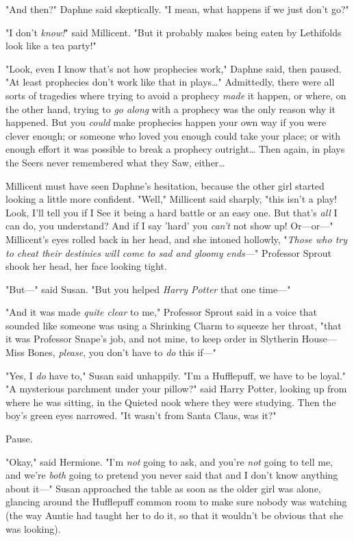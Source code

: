 "And then?" Daphne said skeptically. "I mean, what happens if we just don't go?"

"I don't \emph{know!}" said Millicent. "But it probably makes being eaten by 
Lethifolds look like a tea party!"

"Look, even I know that's not how prophecies work," Daphne said, then paused. 
"At least prophecies don't work like that in plays{\ldots}" Admittedly, there 
were all sorts of tragedies where trying to avoid a prophecy \emph{made} it 
happen, or where, on the other hand, trying to \emph{go along} with a prophecy 
was the only reason why it happened. But you \emph{could} make prophecies 
happen your own way if you were clever enough; or someone who loved you enough 
could take your place; or with enough effort it was possible to break a 
prophecy outright{\ldots} Then again, in plays the Seers never remembered what 
they Saw, either{\ldots}

Millicent must have seen Daphne's hesitation, because the other girl started 
looking a little more confident. "Well," Millicent said sharply, "this isn't a 
play! Look, I'll tell you if I See it being a hard battle or an easy one. But 
that's \emph{all} I can do, you understand? And if I say 'hard' you 
\emph{can't} not show up! Or---or---" Millicent's eyes rolled back in her head, 
and she intoned hollowly, "\emph{Those who try to cheat their destinies will 
come to sad and gloomy ends---}"
\sbreak
Professor Sprout shook her head, her face looking tight.

"But---" said Susan. "But you helped \emph{Harry Potter} that one time---"

"And it was made \emph{quite clear} to me," Professor Sprout said in a voice 
that sounded like someone was using a Shrinking Charm to squeeze her throat, 
"that it was Professor Snape's job, and not mine, to keep order in Slytherin 
House---Miss Bones, \emph{please}, you don't have to \emph{do} this if---"

"Yes, I \emph{do} have to," Susan said unhappily. "I'm a Hufflepuff, we have to 
be loyal."
\sbreak
"A mysterious parchment under your pillow?" said Harry Potter, looking up from 
where he was sitting, in the Quieted nook where they were studying. Then the 
boy's green eyes narrowed. "It wasn't from Santa Claus, was it?"

Pause.

"Okay," said Hermione. "I'm \emph{not} going to ask, and you're \emph{not} 
going to tell me, and we're \emph{both} going to pretend you never said that 
and I don't know anything about it---"
\sbreak
Susan approached the table as soon as the older girl was alone, glancing around 
the Hufflepuff common room to make sure nobody was watching (the way Auntie had 
taught her to do it, so that it wouldn't be obvious that she was looking).

